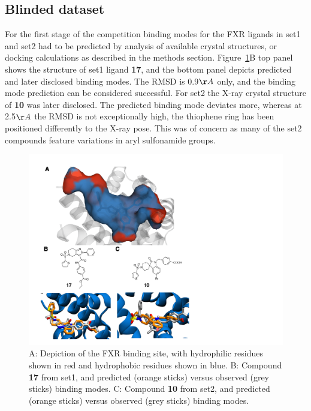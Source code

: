 \documentclass{svjour3}                     %
\begin{document}
\subsection{Blinded dataset}

For the first stage of the competition binding modes for the FXR ligands in set1 and set2 had to be predicted by analysis of available crystal structures, or docking calculations as described in the methods section. Figure~\ref{fig:fig2}B top panel shows the structure of set1 ligand \textbf{17}, and the bottom panel depicts predicted and later disclosed binding modes. The RMSD is 0.9$\AA$ only, and the binding mode prediction can be considered successful. For set2 the X-ray crystal structure of \textbf{10} was later disclosed. The predicted binding mode deviates more, whereas at 2.5$\AA$ the RMSD is not exceptionally high, the thiophene ring has been positioned differently to the X-ray pose. This was of concern as many of the set2 compounds feature variations in aryl sulfonamide groups. 

\begin{figure}
\includegraphics[width=\textwidth]{Figure_2.pdf}
\caption{A: Depiction of the FXR binding site, with hydrophilic residues shown in red and hydrophobic residues shown in blue. B: Compound \textbf{17} from set1, and predicted (orange sticks) versus observed (grey sticks) binding modes. C: Compound \textbf{10} from set2, and predicted (orange sticks) versus observed (grey sticks) binding modes. }
\label{fig:fig2}
\end{figure}
\end{document}
